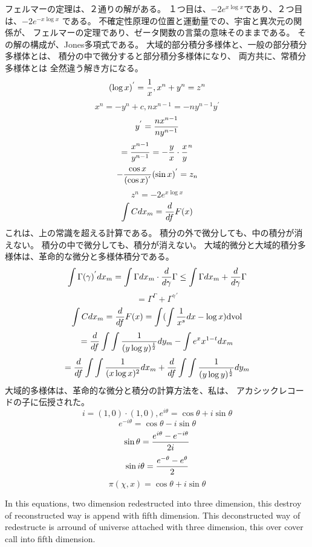 \documentclass{jsarticle}
\begin{document}
    フェルマーの定理は、２通りの解がある。
    １つ目は、$ -2e^{x \log x} $であり、２つ目は、$ -2 e^{- x \log x} $
    である。
    不確定性原理の位置と運動量での、宇宙と異次元の関係が、
    フェルマーの定理であり、ゼータ関数の言葉の意味そのままである。
    その解の構成が、Jones多項式である。
    大域的部分積分多様体と、一般の部分積分多様体とは、
    積分の中で微分すると部分積分多様体になり、
    両方共に、常積分多様体とは
    全然違う解き方になる。
    $$ (\log x)^{'} = {1 \over x}, x^n+ y^n = z^n $$
    $$ x^n = -y^n + c, nx^{n-1} = -ny^{n-1}y^{'} $$
    $$ y^{'} ={{nx^{n-1}} \over {ny^{n-1}}} $$
    $$ ={x^{n-1} \over y^{n-1}} = - {{y \over x}\cdot{x \over y}^n} $$
    $$ -{{\cos x} \over (\cos x)^{'}}(\sin x)^{'} = z_n $$
    $$ z^n = - 2 e^{x \log x} $$
    $$ \int C dx_m = {d \over df}F(x) $$
    これは、上の常識を超える計算である。
    積分の外で微分しても、中の積分が消えない。
    積分の中で微分しても、積分が消えない。
    大域的微分と大域的積分多様体は、革命的な微分と多様体積分である。
    $$  \int \Gamma(\gamma)^{'}dx_m = \int \Gamma dx_m \cdot {d \over 
    d \gamma}\Gamma \le \int \Gamma dx_m + {d \over d \gamma}\Gamma $$
    $$ = \Gamma^{\Gamma} + {\Gamma^{\gamma}}^{'} $$
    $$  \int C dx_m = {d \over df}F(x) = \int(\int {1 \over x^s}dx - \log x)
    \mathrm{dvol} $$
    $$ = {d \over df}\int \int{1 \over {(y \log y)^{1 \over 2}}}dy_m - 
    \int e^x x^{1 - t}dx_m $$
    $$ = {d \over df}\int\int{1 \over {(x \log x)^2}}dx_m +
    {d \over df}\int\int{1 \over {(y \log y)^{1 \over 2}}}dy_m$$
    大域的多様体は、革命的な微分と積分の計算方法を、私は、
    アカシックレコードの子に伝授された。
   $$ i = (1,0)\cdot (1,0), e^{i\theta} = \cos \theta + i \sin \theta $$
   $$ e^{-i \theta} = \cos \theta - i\sin \theta $$
   $$ \sin \theta = {e^{i \theta} - e^{-i \theta} \over 2i} $$
   $$ \sin i \theta = {e^{-\theta} - e^{\theta} \over 2} $$
   $$ \pi (\chi,x) = \cos \theta + i \sin \theta $$

   In this equations, two dimension redestructed into three dimension,
   this destroy of reconstructed way is append with fifth dimension.
   This deconstructed way of redestructe is arround of universe attached
   with three dimension, this over cover call into fifth dimension.
\end{document}
